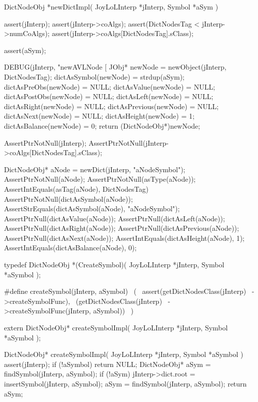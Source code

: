 DictNodeObj *newDictImpl(
  JoyLoLInterp *jInterp,
  Symbol *aSym
) {
  assert(jInterp);
  assert(jInterp->coAlgs);
  assert(DictNodesTag < jInterp->numCoAlgs);
  assert(jInterp->coAlgs[DictNodesTag].sClass);
  
  assert(aSym);
  
  DEBUG(jInterp, "newAVLNode [%
  JObj* newNode   = newObject(jInterp, DictNodesTag);
  dictAsSymbol(newNode)   = strdup(aSym);
  dictAsPreObs(newNode)   = NULL;
  dictAsValue(newNode)    = NULL;
  dictAsPostObs(newNode)  = NULL;
  dictAsLeft(newNode)     = NULL;
  dictAsRight(newNode)    = NULL;
  dictAsPrevious(newNode) = NULL;
  dictAsNext(newNode)     = NULL;
  dictAsHeight(newNode)   = 1;
  dictAsBalance(newNode)  = 0;
  return (DictNodeObj*)newNode;
}
\stopCCode


\startCTest
  AssertPtrNotNull(jInterp);
  AssertPtrNotNull(jInterp->coAlgs[DictNodesTag].sClass);

  DictNodeObj* aNode = newDict(jInterp, "aNodeSymbol");
  AssertPtrNotNull(aNode);
  AssertPtrNotNull(asType(aNode));
  AssertIntEquals(asTag(aNode), DictNodesTag)
  AssertPtrNotNull(dictAsSymbol(aNode));
  AssertStrEquals(dictAsSymbol(aNode), "aNodeSymbol");
  AssertPtrNull(dictAsValue(aNode));
  AssertPtrNull(dictAsLeft(aNode));
  AssertPtrNull(dictAsRight(aNode));
  AssertPtrNull(dictAsPrevious(aNode));
  AssertPtrNull(dictAsNext(aNode));
  AssertIntEquals(dictAsHeight(aNode), 1);
  AssertIntEquals(dictAsBalance(aNode), 0);
\stopCTest
\stopTestCase
\stopTestSuite

\startTestSuite[createSymbol]

\startCHeader
typedef DictNodeObj *(CreateSymbol)(
  JoyLoLInterp *jInterp,
  Symbol       *aSymbol
);

#define createSymbol(jInterp, aSymbol)      \
  (                                         \
    assert(getDictNodesClass(jInterp)    \
      ->createSymbolFunc),                  \
    (getDictNodesClass(jInterp)          \
      ->createSymbolFunc(jInterp, aSymbol)) \
  )
\stopCHeader

\setCHeaderStream{private}
\startCHeader
extern DictNodeObj* createSymbolImpl(
  JoyLoLInterp *jInterp,
  Symbol       *aSymbol
);
\stopCHeader
{}

\startCCode
DictNodeObj* createSymbolImpl(
  JoyLoLInterp *jInterp,
  Symbol       *aSymbol
) {
  assert(jInterp);
  if (!aSymbol) return NULL;
  DictNodeObj* aSym = findSymbol(jInterp, aSymbol);
  if (!aSym) {
    jInterp->dict.root = insertSymbol(jInterp, aSymbol);
    aSym = findSymbol(jInterp, aSymbol);
  }
  return aSym;
}
\stopCCode
\stopTestSuite

